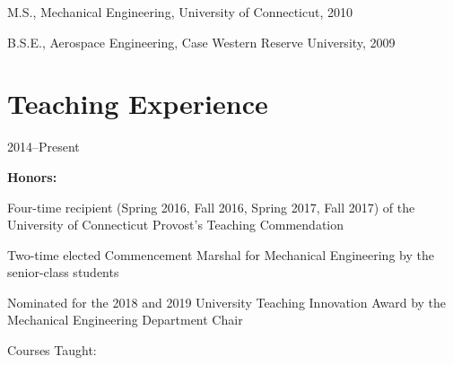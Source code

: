 M.S., Mechanical Engineering, University of Connecticut, 2010

B.S.E., Aerospace Engineering, Case Western Reserve University, 2009

\section{{\sectionfont{} Teaching Experience}}

 \hfill 2014--Present

\textbf{Honors:}

\begin{innerlist}
    \item Four-time recipient (Spring 2016, Fall 2016, Spring 2017, Fall 2017) of the University of Connecticut Provost's Teaching Commendation
    \item Two-time elected Commencement Marshal for Mechanical Engineering by the senior-class students
    \item Nominated for the 2018 and 2019 University Teaching Innovation Award by the Mechanical Engineering Department Chair
\end{innerlist}

\vspace{0.5\baselineskip}

Courses Taught:

